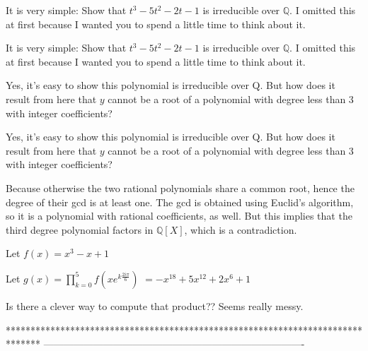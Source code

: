 \begin{solution}
	It is very simple: Show that $t^3-5t^2-2t-1$ is irreducible over $\mathbb{Q}$.  I omitted this at first because I wanted you to spend a little time to think about it.
\end{solution}



\begin{solution}
	\begin{tcolorbox}It is very simple: Show that $t^3-5t^2-2t-1$ is irreducible over $\mathbb{Q}$.  I omitted this at first because I wanted you to spend a little time to think about it.\end{tcolorbox}
Yes, it's easy to show  this polynomial is irreducible over Q. But how does it result from here
that $y$ cannot be a root of a polynomial with degree less than 3 with integer coefficients?
\end{solution}



\begin{solution}
	\begin{tcolorbox}
Yes, it's easy to show  this polynomial is irreducible over Q. But how does it result from here
that $y$ cannot be a root of a polynomial with degree less than 3 with integer coefficients?\end{tcolorbox}

Because otherwise the two rational polynomials share a common root, hence the degree of their gcd is at least one. The gcd is obtained using Euclid's algorithm, so it is a polynomial with rational coefficients, as well. But this implies that the third degree polynomial factors in $\mathbb{Q}[X]$, which is a contradiction.
\end{solution}



\begin{solution}
	\begin{tcolorbox}
Let $f(x)=x^3-x+1$

Let $g(x)=\prod_{k=0}^5f(xe^{k\frac{2i\pi}6})$ $=-x^{18}+5x^{12}+2x^6+1$
\end{tcolorbox}

Is there a clever way to compute that product?? 
Seems really messy.
\end{solution}
*******************************************************************************
-------------------------------------------------------------------------------

